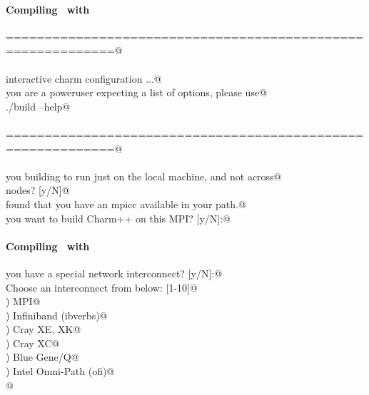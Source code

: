 
\begin{frame}[fragile] 
\secframetitle{\ssInstallCharm}
\framesubtitle{Compiling \charm\ with }
\color{black}
\footnotesize

\prompt{}
\pause

\verb@============================================================@ \\
\ \\
\verb@Begin interactive charm configuration ...@\\
\verb@If you are a poweruser expecting a list of options, please use@ \\
\verb@   ./build --help@\\
\ \\
\verb@============================================================@ \\
\ \\
\verb@Are you building to run just on the local machine, and not across@ \\
\verb@multiple nodes? [y/N]@ \\
\pause
\verb@I found that you have an mpicc available in your path.@ \\
\verb@Do you want to build Charm++ on this MPI? [y/N]:@ \\
\end{frame}


\begin{frame}[fragile] 
\secframetitle{\ssInstallCharm}
\framesubtitle{Compiling \charm\ with }
\color{black}
\footnotesize

\verb@Do you have a special network interconnect? [y/N]:@
\pause
\verb@y@ \\
\verb@	Choose an interconnect from below: [1-10]@ \\
) MPI@ \\
) Infiniband (ibverbs)@ \\
) Cray XE, XK@ \\
) Cray XC@ \\
) Blue Gene/Q@ \\
) Intel Omni-Path (ofi)@ \\
\verb@  @
\end{frame}

